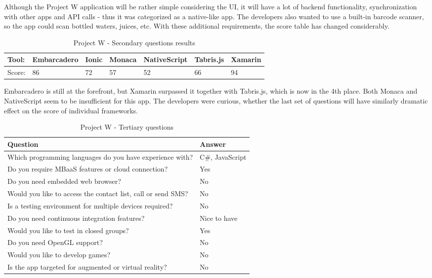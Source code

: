 \documentclass[english,master,public,dept460,male,cpdeclaration,oneside]{diploma}
\begin{document}
Although the Project W application will be rather simple considering the UI, it will have a lot of backend functionality, synchronization with other apps and API calls - thus it was categorized as a native-like app. The developers also wanted to use a built-in barcode scanner, so the app could scan bottled waters, juices, etc. With these additional requirements, the score table has changed considerably.

\begin{table}[!h]
	\centering
	\caption{Project W - Secondary questions results}
	\begin{tabular}{p{2cm} | p{1.5cm} | p{1.5cm} | p{1.5cm} | p{1.5cm} | p{1.5cm} | p{1.5cm}}
		\toprule		
		\textbf{Tool:} & \textbf{Embarcadero} & \textbf{Ionic} & \textbf{Monaca} & \textbf{NativeScript} & \textbf{Tabris.js} & \textbf{Xamarin} \\
		\midrule
		Score: & 86 & 72 & 57 & 52 & 66 & 94 \\		
		\midrule
	\end{tabular}
\end{table}

Embarcadero is still at the forefront, but Xamarin surpassed it together with Tabris.js, which is now in the 4th place. Both Monaca and NativeScript seem to be insufficient for this app. The developers were curious, whether the last set of questions will have similarly dramatic effect on the score of individual frameworks.

\begin{table}[!h]
	\centering
	\caption{Project W - Tertiary questions}
	\begin{tabular}{p{7.5cm} | p{5cm}}
		\toprule		
		\textbf{Question} &	\textbf{Answer} \\
		\midrule		
		Which programming languages do you have experience with? & C\#, JavaScript \\
		Do you require MBaaS features or cloud connection? & Yes \\
		Do you need embedded web browser? & No \\
		Would you like to access the contact list, call or send SMS? & No \\
		Is a testing environment for multiple devices required? & No \\
		Do you need continuous integration features? & Nice to have \\
		Would you like to test in closed groups? & Yes \\
		Do you need OpenGL support? & No \\
		Would you like to develop games? & No \\
		Is the app targeted for augmented or virtual reality? & No \\			
		\midrule
	\end{tabular}
\end{table}
\end{document}
